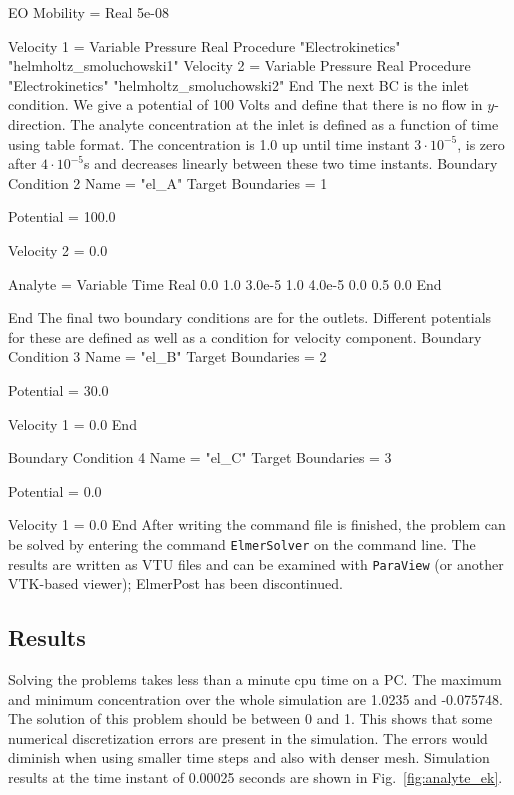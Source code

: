   EO Mobility = Real 5e-08 

  Velocity 1 = Variable Pressure
      Real Procedure  "Electrokinetics" "helmholtz_smoluchowski1"
  Velocity 2 = Variable Pressure
      Real Procedure  "Electrokinetics" "helmholtz_smoluchowski2"
End
\ttend
%
The next BC is the inlet condition. We give a potential of 100 Volts
and define that there is no flow in $y$-direction. The analyte
concentration at the inlet is defined as a function of time using
table format. The concentration is 1.0 up until time instant $3\cdot
10^{-5}$, is zero after $4\cdot 10^{-5}$s and decreases linearly
between these two time instants.
%
\ttbegin
Boundary Condition 2
  Name = "el_A"
  Target Boundaries = 1

  Potential = 100.0

  Velocity 2 = 0.0

  Analyte = Variable Time
    Real
      0.0      1.0
      3.0e-5   1.0
      4.0e-5   0.0
      0.5      0.0
    End

End
\ttend
% 
The final two boundary conditions are for the outlets. Different
potentials for these are defined as well as a condition for velocity
component.
%
\ttbegin
Boundary Condition 3
  Name = "el_B"
  Target Boundaries = 2

  Potential = 30.0

  Velocity 1 = 0.0
End

Boundary Condition 4
  Name = "el_C"
  Target Boundaries = 3

  Potential = 0.0 

  Velocity 1 = 0.0
End
\ttend
%
After writing the command file is finished, the problem can be solved
by entering the command \texttt{ElmerSolver} on the command line. The
results are written as VTU files and can be examined with
\texttt{ParaView} (or another VTK-based viewer); ElmerPost has been
discontinued.


\subsection*{Results}

Solving the problems takes less than a minute cpu time on a PC. The
maximum and minimum concentration over the whole simulation are 1.0235
and -0.075748. The solution of this problem should be between 0 and
1. This shows that some numerical discretization errors are present in
the simulation. The errors would diminish when using smaller time steps
and also with denser mesh. Simulation results at the time
instant of 0.00025 seconds are shown in Fig.~\ref{fig:analyte_ek}.

